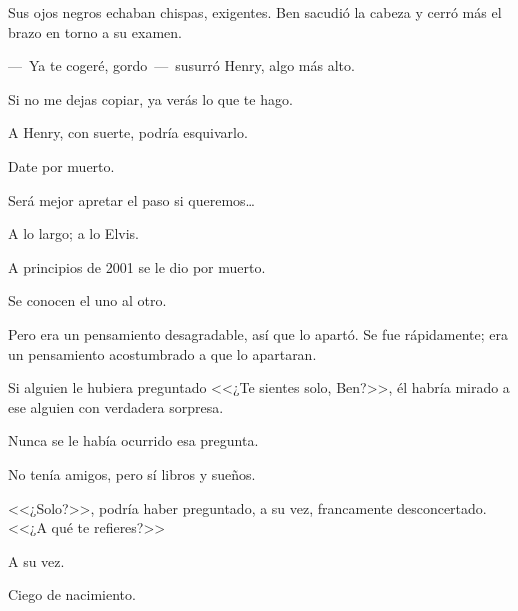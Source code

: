 Sus ojos negros echaban chispas, exigentes.
Ben sacudió la cabeza y cerró más el brazo en
torno a su examen.

---~Ya te cogeré, gordo~---~susurró Henry, algo
más alto.




\sk
Si no me dejas copiar, ya verás lo que te
hago.

\sk
A Henry, con suerte, podría esquivarlo. 

\sk
Date por muerto. 

\sk
Será mejor apretar el paso si queremos\ldots{} 

\sk
A lo largo; a lo Elvis.\nb{}

\sk
A principios de 2001 se le dio por muerto.  

\sk
Se conocen el uno al otro. 

\sk
Pero era un pensamiento desagradable, así que
lo apartó. Se fue rápidamente; era un pensamiento
acostumbrado a que lo apartaran.

\sk
Si alguien le hubiera preguntado <<¿Te sientes
solo, Ben?>>, él habría mirado a ese alguien con
verdadera sorpresa. 

\sk
Nunca se le había ocurrido
esa pregunta. 

\sk
No tenía amigos, pero sí libros y
sueños. 

\sk
<<¿Solo?>>, podría haber preguntado, a su vez,
francamente desconcertado. <<¿A qué te refieres?>>

\sk
A su vez. 

\sk
Ciego de nacimiento. 

